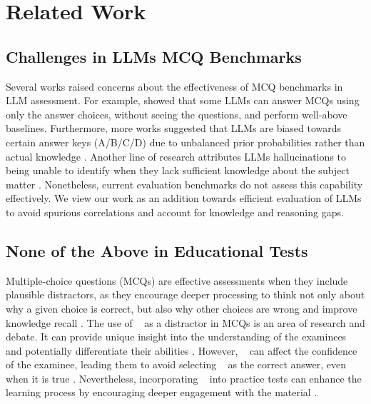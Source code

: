 \section{Related Work}
\subsection{Challenges in LLMs MCQ Benchmarks }

Several works raised concerns about the effectiveness of MCQ benchmarks in LLM
assessment. For example, \citet{balepur2024artifactsabductionllmsanswer} showed
that some LLMs can answer MCQs using only the answer choices, without seeing
the questions, and perform well-above baselines. Furthermore, more works
suggested that LLMs are biased towards certain answer keys (A/B/C/D) due to
unbalanced prior probabilities rather than actual knowledge
\citep{myrzakhan2024openllmleaderboardmultichoiceopenstylequestions,clark2018thinksolvedquestionanswering}.
Another line of research attributes LLMs hallucinations to being unable to
identify when they lack sufficient knowledge about the subject matter
\citep{li2024thinktwicetrustingselfdetection, ji-etal-2022-answer}.
Nonetheless, current evaluation benchmarks do not assess this capability
effectively. We view our work as an addition towards efficient evaluation of
LLMs to avoid spurious correlations and account for knowledge and reasoning
gaps.

\subsection{None of the Above in Educational Tests}

Multiple-choice questions (MCQs) are effective assessments when they include
plausible distractors, as they encourage deeper processing to think not only
about why a given choice is correct, but also why other choices are wrong and
improve knowledge recall \cite{little2019role, little2015optimizing}. The use
of \nota~ as a distractor in MCQs is an area of research and debate. It can
provide unique insight into the understanding of the examinees and potentially
differentiate their abilities \cite{DiBattista03042014, dochy2001assessment}.
However, \nota~ can affect the confidence of the examinee, leading them to
avoid selecting \nota~ as the correct answer, even when it is true
\cite{little2023does, odegard2007none}. Nevertheless, incorporating \nota~ into
practice tests can enhance the learning process by encouraging deeper
engagement with the material \cite{DiBattista03042014,
    pezeshkpour-hruschka-2024-large, zheng2024largelanguagemodelsrobust}.